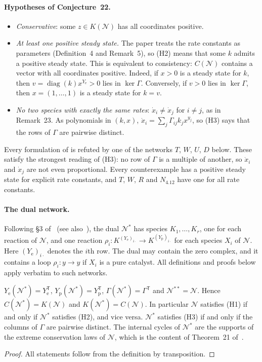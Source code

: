 \documentclass[11pt,a4paper]{report}
\newcommand{\Net}{\mathcal{N}}
\newcommand{\Ye}{Y_{\mathrm e}}
\newcommand{\Yp}{Y_{\mathrm p}}
\begin{document}
\paragraph{Hypotheses of Conjecture~22.}
\begin{itemize}
\item[(H1)] \emph{Conservative}: some \(z\in K(\Net)\) has all coordinates positive.
\item[(H2)] \emph{At least one positive steady state.} The paper treats the rate constants as parameters
(Definition~4 and Remark~5), so (H2) means that some \(k\) admits a positive steady state. This is equivalent to
consistency: \(C(\Net)\) contains a vector with all coordinates positive. Indeed, if \(x>0\) is a steady state for
\(k\), then \(v=\operatorname{diag}(k)x^{\Ye}>0\) lies in \(\ker\Gamma\). Conversely, if \(v>0\) lies in
\(\ker\Gamma\), then \(x=(1,\dots,1)\) is a steady state for \(k=v\).
\item[(H3)] \emph{No two species with exactly the same rates}: \(\dot x_i\neq\dot x_j\) for \(i\neq j\), as in
Remark~23. As polynomials in \((k,x)\), \(\dot x_i=\sum_j\Gamma_{ij}k_jx^{y_j}\), so (H3) says that the rows of
\(\Gamma\) are pairwise distinct.
\end{itemize}
Every formulation of  is refuted by one of the networks \(T\), \(W\), \(U\), \(D\) below. These
satisfy the strongest reading of (H3): no row of \(\Gamma\) is a multiple of another, so \(\dot x_i\) and \(\dot x_j\)
are not even proportional. Every counterexample has a positive steady state for explicit rate constants, and
\(T\), \(W\), \(R\) and \(N_{4.12}\) have one for all rate constants.

\paragraph{The dual network.} Following §3 of~\autocite{Iosif2026} (see also~\autocite{BlanchiniGiordano2022}), the
dual \(\Net^*\) has species \(K_1,\dots,K_r\), one for each reaction of \(\Net\), and one reaction
\(\rho_i\colon K^{(\Ye)_{i\cdot}}\to K^{(\Yp)_{i\cdot}}\) for each species \(X_i\) of \(\Net\). Here
\((\Ye)_{i\cdot}\) denotes the \(i\)th row. The dual may contain the zero complex, and it contains a loop
\(\rho_i\colon y\to y\) if \(X_i\) is a pure catalyst. All definitions and proofs below apply verbatim to such
networks.

\begin{lemma}\label{lem:dual}
\(\Ye(\Net^*)=\Ye^{\mathsf T}\), \(\Yp(\Net^*)=\Yp^{\mathsf T}\), \(\Gamma(\Net^*)=\Gamma^{\mathsf T}\) and
\(\Net^{**}=\Net\). Hence \(C(\Net^*)=K(\Net)\) and \(K(\Net^*)=C(\Net)\). In particular \(\Net\) satisfies (H1) if
and only if \(\Net^*\) satisfies (H2), and vice versa. \(\Net^*\) satisfies (H3) if and only if the columns of
\(\Gamma\) are pairwise distinct. The internal cycles of \(\Net^*\) are the supports of the extreme conservation laws
of \(\Net\), which is the content of Theorem~21 of~\autocite{Iosif2026}.
\end{lemma}
\begin{proof}
All statements follow from the definition by transposition.
\end{proof}
\end{document}
